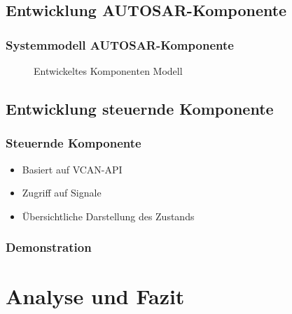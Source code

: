 \documentclass[]{beamer}
\newcommand{\inputImage}[1]{}
\begin{document}
\subsection{Entwicklung AUTOSAR-Komponente}
\begin{frame}
\frametitle{Systemmodell AUTOSAR-Komponente}
    \begin{figure}[ht]
        \centering
        \resizebox{\linewidth}{!}{\inputImage{SMLS_Modell.dia}}
        \caption{Entwickeltes Komponenten Modell}
        \label{fig:smls_modell}
    \end{figure}
\end{frame}




\subsection{Entwicklung steuernde Komponente}
\begin{frame}
\frametitle{Steuernde Komponente}
    \begin{itemize}
        \item Basiert auf VCAN-API
        \item Zugriff auf Signale
        \item Übersichtliche Darstellung des Zustands
    \end{itemize}
\end{frame}

\begin{frame}
\frametitle{Demonstration}

\end{frame}





\section{Analyse und Fazit}
\label{sec:analyse_fazit}

\end{document}
